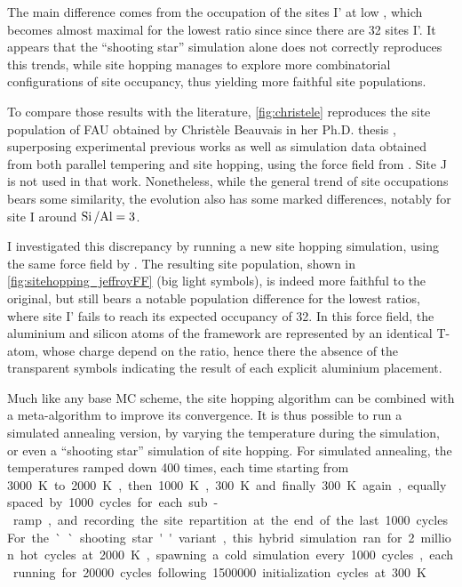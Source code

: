 \documentclass[main.tex]{subfiles}
\begin{document}
The main difference comes from the occupation of the sites I' at low \SiAl, which becomes almost maximal for the lowest ratio since since there are 32 sites I'. It appears that the ``shooting star'' simulation alone does not correctly reproduces this trends, while site hopping manages to explore more combinatorial configurations of site occupancy, thus yielding more faithful site populations.

To compare those results with the literature, \cref{fig:christele} reproduces the site population of FAU obtained by Christèle Beauvais in her Ph.D. thesis \cite{Beauvais}, superposing experimental previous works as well as simulation data obtained from both parallel tempering and site hopping, using the force field from \textcite{DiLellaFF}. Site J is not used in that work. Nonetheless, while the general trend of site occupations bears some similarity, the evolution also has some marked differences, notably for site I around $\mbox{Si\,/Al} = 3$.

I investigated this discrepancy by running a new site hopping simulation, using the same force field by \textcite{DiLellaFF}. The resulting site population, shown in \cref{fig:sitehopping_jeffroyFF} (big light symbols), is indeed more faithful to the original, but still bears a notable population difference for the lowest \SiAl ratios, where site I' fails to reach its expected occupancy of 32. In this force field, the aluminium and silicon atoms of the framework are represented by an identical T-atom, whose charge depend on the \SiAl ratio, hence there the absence of the transparent symbols indicating the result of each explicit aluminium placement.

Much like any base MC scheme, the site hopping algorithm can be combined with a meta-algorithm to improve its convergence. It is thus possible to run a simulated annealing version, by varying the temperature during the simulation, or even a ``shooting star'' simulation of site hopping. For simulated annealing, the temperatures ramped down \num{400} times, each time starting from \qty{3000}K to \qty{2000}K, then \qty{1000}K, \qty{300}K and finally \qty{300}K again, equally spaced by \num{1000} cycles for each sub-ramp, and recording the site repartition at the end of the last \num{1000} cycles. For the ``shooting star'' variant, this hybrid simulation ran for 2 million hot cycles at \qty{2000}K, spawning a cold simulation every \num{1000} cycles, each running for \num{20000} cycles following \num{1500000} initialization cycles at \qty{300}K.\label{sitehopping_simulatedannealing}
\end{document}
